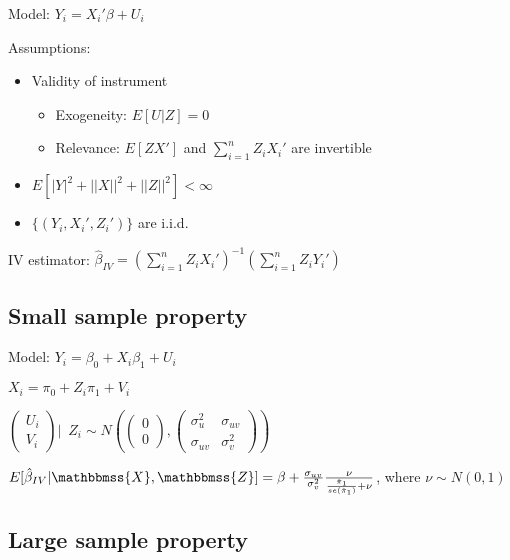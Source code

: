 \documentclass[10pt,landscape]{article}
\begin{document}
\begin{multicols}{3}
Model: $Y_i = X_i'\beta + U_i$

Assumptions: 
\begin{itemize}
  \item Validity of instrument
  \begin{itemize}
    \item Exogeneity: $E[U | Z] = 0$
    \item Relevance: $E[Z X']$ and $\sum_{i=1}^n Z_i X_i'$ are invertible
  \end{itemize}
  \item $E[|Y|^2 + ||X||^2 + ||Z||^2] < \infty$
  \item $\{ (Y_i, X_i', Z_i') \}$ are i.i.d.
\end{itemize}

IV estimator: $\hat{\beta}_{IV} = (\sum_{i=1}^n Z_i X_i')^{-1} (\sum_{i=1}^n Z_i Y_i')$

\subsection{Small sample property}
Model: $Y_i = \beta_0 + X_i \beta_1 + U_i$

\hspace{24pt} $X_i = \pi_0 + Z_i \pi_1 + V_i$

\vspace{3pt}
\hspace{24pt} $
  \begin{pmatrix}
    U_i \\ 
    V_i
  \end{pmatrix} \bigg| \enspace Z_i \sim N \left( 
    \begin{pmatrix}
      0 \\ 
      0
    \end{pmatrix}, 
    \begin{pmatrix}
      \sigma_u^2 & \sigma_{uv} \\ 
      \sigma_{uv} & \sigma_v^2
    \end{pmatrix} \right)
$
\vspace{3pt}

\then $E[\hat{\beta}_{IV} | \mathbbmss{X}, \mathbbmss{Z}] = \beta + \frac{\sigma_{uv}}{\sigma_v^2} \frac{\nu}{\frac{\hat{\pi}_1}{se(\hat{\pi}_1)} + \nu}$, where $\nu \sim N(0, 1)$

\subsection{Large sample property}


\end{multicols}
\end{document}
